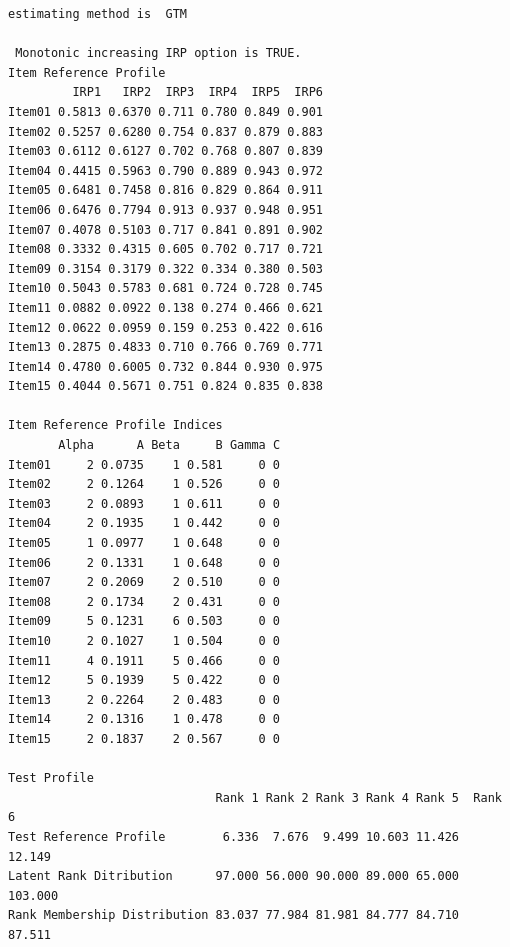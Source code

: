 \documentclass[
  a4paper,
]{ltjsbook}
\begin{document}
\begin{verbatim}
estimating method is  GTM 

 Monotonic increasing IRP option is TRUE.
Item Reference Profile
         IRP1   IRP2  IRP3  IRP4  IRP5  IRP6
Item01 0.5813 0.6370 0.711 0.780 0.849 0.901
Item02 0.5257 0.6280 0.754 0.837 0.879 0.883
Item03 0.6112 0.6127 0.702 0.768 0.807 0.839
Item04 0.4415 0.5963 0.790 0.889 0.943 0.972
Item05 0.6481 0.7458 0.816 0.829 0.864 0.911
Item06 0.6476 0.7794 0.913 0.937 0.948 0.951
Item07 0.4078 0.5103 0.717 0.841 0.891 0.902
Item08 0.3332 0.4315 0.605 0.702 0.717 0.721
Item09 0.3154 0.3179 0.322 0.334 0.380 0.503
Item10 0.5043 0.5783 0.681 0.724 0.728 0.745
Item11 0.0882 0.0922 0.138 0.274 0.466 0.621
Item12 0.0622 0.0959 0.159 0.253 0.422 0.616
Item13 0.2875 0.4833 0.710 0.766 0.769 0.771
Item14 0.4780 0.6005 0.732 0.844 0.930 0.975
Item15 0.4044 0.5671 0.751 0.824 0.835 0.838

Item Reference Profile Indices
       Alpha      A Beta     B Gamma C
Item01     2 0.0735    1 0.581     0 0
Item02     2 0.1264    1 0.526     0 0
Item03     2 0.0893    1 0.611     0 0
Item04     2 0.1935    1 0.442     0 0
Item05     1 0.0977    1 0.648     0 0
Item06     2 0.1331    1 0.648     0 0
Item07     2 0.2069    2 0.510     0 0
Item08     2 0.1734    2 0.431     0 0
Item09     5 0.1231    6 0.503     0 0
Item10     2 0.1027    1 0.504     0 0
Item11     4 0.1911    5 0.466     0 0
Item12     5 0.1939    5 0.422     0 0
Item13     2 0.2264    2 0.483     0 0
Item14     2 0.1316    1 0.478     0 0
Item15     2 0.1837    2 0.567     0 0

Test Profile
                             Rank 1 Rank 2 Rank 3 Rank 4 Rank 5  Rank 6
Test Reference Profile        6.336  7.676  9.499 10.603 11.426  12.149
Latent Rank Ditribution      97.000 56.000 90.000 89.000 65.000 103.000
Rank Membership Distribution 83.037 77.984 81.981 84.777 84.710  87.511


\end{verbatim}
\end{document}
